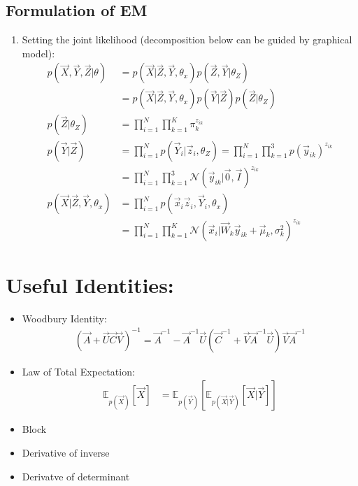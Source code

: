 \documentclass[12pt,twoside]{article}
\begin{document}
\subsection{Formulation of EM}
\begin{enumerate}
\item Setting the joint likelihood (decomposition below can be guided by graphical model):	
	\begin{align*}
	p(\vec{X}, \vec{Y}, \vec{Z} \vert \theta) 
	&= p(\vec{X} \vert \vec{Z}, \vec{Y}, \theta_x)p(\vec{Z}, \vec{Y}\vert \theta_Z)\\
	&= p(\vec{X} \vert \vec{Z}, \vec{Y}, \theta_x)p(\vec{Y}\vert \vec{Z})p(\vec{Z}\vert \theta_Z)\\
	p(\vec{Z}\vert \theta_Z)
	&= \prod_{i=1}^N \prod_{k=1}^K \pi_k^{z_{ik}}\\
	p(\vec{Y}\vert \vec{Z})
	&= \prod_{i=1}^N p(\vec{Y}_i\vert \vec{z}_i, \theta_Z)
	= \prod_{i=1}^N \prod_{k=1}^3 p(\vec{y}_{ik})^{z_{ik}}\\
	&= \prod_{i=1}^N \prod_{k=1}^3 \mathcal{N}(\vec{y}_{ik}\vert \vec{0}, \vec{I})^{z_{ik}}\\
	p(\vec{X} \vert \vec{Z}, \vec{Y}, \theta_x)
	&=\prod_{i=1}^N p(\vec{x}_i \vec{z}_i, \vec{Y}_i, \theta_x)\\
	&=\prod_{i=1}^N\prod_{k=1}^K \mathcal{N}(\vec{x}_i \vert \vec{W}_k\vec{y}_{ik}+\vec{\mu}_k, \sigma_k^2)^{z_{ik}}
	\end{align*}
\end{enumerate}





\section{Useful Identities:}

\begin{itemize}
\item Woodbury Identity:
	\begin{align*}
		(\vec{A} + \vec{U}\vec{C}\vec{V})^{-1} = \vec{A}^{-1}-\vec{A}^{-1} \vec{U}(\vec{C}^{-1}+\vec{V}\vec{A}^{-1}\vec{U})\vec{V}\vec{A}^{-1}
	\end{align*}

\item Law of Total Expectation:
	\begin{align*}
		\mathbb{E}_{p(\vec{X})}[\vec{X}] & =\mathbb{E}_{p(\vec{Y})}[\mathbb{E}_{p(\vec{X}\vert\vec{Y})}[\vec{X}\vert \vec{Y}]] 
	\end{align*}


\item Block 
\item Derivative of inverse
\item Derivatve of determinant
\end{itemize}
\end{document}
